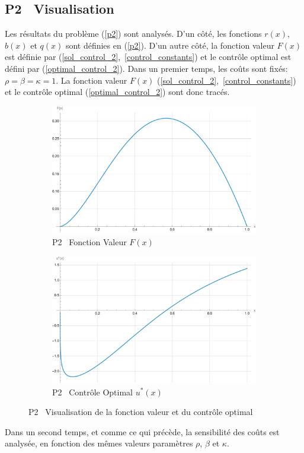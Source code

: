 \subsection{P2 \textemdash~Visualisation}
Les résultats du problème (\ref{p2}) sont analysés. D'un côté, les fonctions $r(x)$, $b(x)$ et $q(x)$ sont définies en (\ref{p2}). D'un autre côté, la fonction valeur $F(x)$ est définie par (\ref{sol_control_2},~\ref{control_constants}) et le contrôle optimal est défini par (\ref{optimal_control_2}). Dans un premier temps, les coûts sont fixés: $\rho=\beta=\kappa=1$. La fonction valeur $F(x)$ (\ref{sol_control_2},~\ref{control_constants}) et le contrôle optimal (\ref{optimal_control_2}) sont donc tracés.
\begin{figure}[htb]
    \centering
    \begin{subfigure}{0.45\linewidth}
        \includegraphics[width=\linewidth]{img/validation/P2/p2_value.pdf}
        \caption{P2 \textemdash~Fonction Valeur $F(x)$}\label{fig:ValueVisualisation2}
    \end{subfigure}
    \hfill
    \begin{subfigure}{0.45\linewidth}
        \includegraphics[width=\linewidth]{img/validation/P2/p2_control.pdf}
        \caption{P2 \textemdash~Contrôle Optimal $u^*(x)$}\label{fig:ControlVisualisation2}
    \end{subfigure}
    \caption{P2 \textemdash~Visualisation de la fonction valeur et du contrôle optimal}\label{fig:ValueControlComparison2}
\end{figure}\FloatBarrier Dans un second temps, et comme ce qui précède, la sensibilité des coûts est analysée, en fonction des mêmes valeurs paramètres $\rho$, $\beta$ et $\kappa$.
